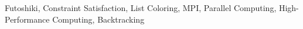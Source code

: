 \documentclass[10pt, conference]{IEEEtran}
\begin{document}
\begin{IEEEkeywords}
Futoshiki, Constraint Satisfaction, List Coloring, MPI, Parallel Computing, High-Performance Computing, Backtracking
\end{IEEEkeywords}











\end{document}
